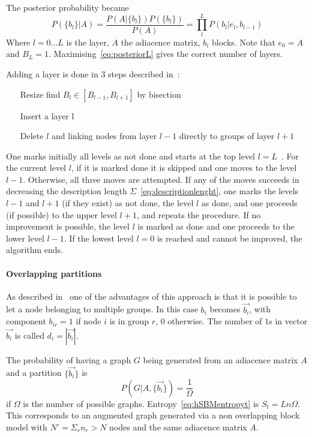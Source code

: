 The posterior probability became
\begin{equation}\label{eq:posteriorL}
  P(\{b_l\}|A)=\frac{P(A|\{b_l\})P(\{b_l\})}{P(A)}=\prod_l^L P(b_l|e_l,b_{l-1})
\end{equation}
Where $l=0\dots L$ is the layer, $A$ the adiacence matrix, $b_i$ blocks. Note that $e_0=A$ and $B_L=1$.
Maximising~\ref{eq:posteriorL} gives the correct number of layers.

Adding a layer is done in 3 steps described in~\cite{peixoto2014hierarchic}:
\begin{itemize}
  \item[Resize] find $B_l\in[B_{l-1},B_{l+1}]$ by bisection
  \item[Insert] a layer l
  \item[Delete] $l$ and linking nodes from layer $l-1$ directly to groups of layer
  $l+1$
\end{itemize}
One marks initially all levels as not done and starts at the top level $l = L$~\cite{peixoto2014hierarchic}.
For the current level $l$, if it is marked done it is skipped and one moves to the level $l-1$.
Otherwise, all three moves are attempted. If any of the moves succeeds in decreasing the description length $\Sigma$~\ref{eq:descriptionlenght},
one marks the levels $l-1$ and $l+1$ (if they exist) as not done, the level $l$ as done, and one proceeds (if possible)
to the upper level $l+1$, and repeats the procedure.
If no improvement is possible, the level $l$ is marked as done and one proceeds to the lower level $l-1$.
If the lowest level $l=0$ is reached and cannot be improved, the algorithm ends.



\paragraph{Overlapping partitions}
As described in~\cite{peixoto2015model} one of the advantages of this approach
is that it is possible to let a node belonging to multiple groups.
In this case $b_i$ becomes $\vec{b_i}$, with component $b_{ir}=1$ if node $i$ is in
group $r$, $0$ otherwise. The number of $1$s in vector $\vec{b_i}$ is called
$d_i=|\vec{b_i}|$.

The probability of having a graph $G$ being generated from an adiacence matrix
$A$ and a partition $\{\vec{b_i}\}$ is \[P(G|A,\{\vec{b_i}\})=\frac{1}{\Omega}\]
if $\Omega$ is the number of possible graphs. Entropy~\ref{eq:hSBMentropyt} is
$S_t=Ln\Omega$. This corresponds to an augmented graph generated via a
non overlapping block model with $N'=\Sigma_r n_r>N$ nodes and the same
adiacence matrix $A$.

